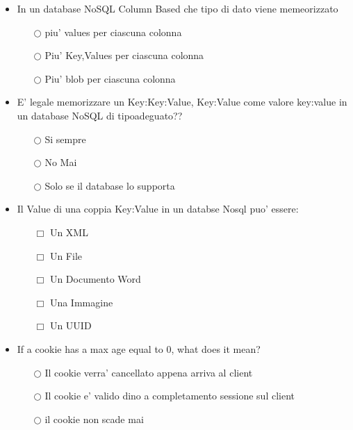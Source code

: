 \documentclass[10pt,twocolumn]{article}
\begin{document}
\begin{itemize}
    \item In un database NoSQL Column Based che tipo di dato viene memeorizzato
          \begin{itemize}
              \item[$\bigcirc$] piu' values per ciascuna colonna
              \item[$\bigcirc$] Piu' Key,Values per ciascuna colonna
              \item[$\bigcirc$] Piu' blob per ciascuna colonna
          \end{itemize}
\end{itemize}
\begin{itemize}
    \item E' legale memorizzare un {Key:{Key:Value, Key:Value}} come valore key:value in un database NoSQL di tipoadeguato??
          \begin{itemize}
              \item[$\bigcirc$] Si sempre
              \item[$\bigcirc$] No Mai
              \item[$\bigcirc$] Solo se il database lo supporta
          \end{itemize}
\end{itemize}
\begin{itemize}
    \item Il Value di una coppia Key:Value in un databse Nosql puo' essere:
          \begin{itemize}
              \item[$\Box$] Un XML
              \item[$\Box$] Un File
              \item[$\Box$] Un Documento Word
              \item[$\Box$] Una Immagine
              \item[$\Box$] Un UUID
          \end{itemize}
\end{itemize}
\begin{itemize}
    \item If a cookie has a max age equal to 0, what does it mean?
          \begin{itemize}
              \item[$\bigcirc$] Il cookie verra' cancellato appena arriva al client
              \item[$\bigcirc$] Il cookie e' valido dino a completamento sessione sul client
              \item[$\bigcirc$] il cookie non scade mai
          \end{itemize}
\end{itemize}
\end{document}
